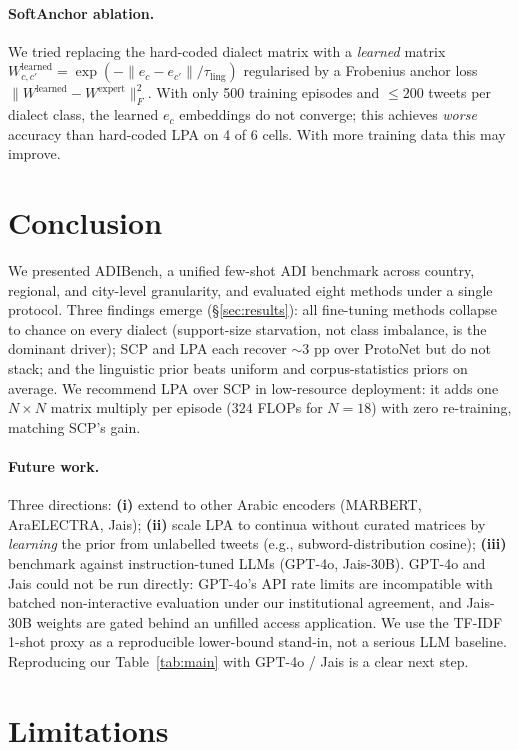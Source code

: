 \documentclass[11pt]{article}
\newcommand{\bench}{ADIBench}
\begin{document}
\paragraph{SoftAnchor ablation.}
We tried replacing the hard-coded dialect matrix with a
\emph{learned} matrix $W^{\text{learned}}_{c, c'} =
\exp(-\|e_c - e_{c'}\|/\tau_{\text{ling}})$ regularised by a
Frobenius anchor loss $\|W^{\text{learned}} - W^{\text{expert}}\|_F^2$.
With only 500 training episodes and $\le 200$ tweets per dialect
class, the learned $e_c$ embeddings do not converge; this
achieves \emph{worse} accuracy than hard-coded LPA on 4 of 6
cells. With more training data this may improve.

\section{Conclusion}
\label{sec:conclusion}
We presented \bench{}, a unified few-shot ADI benchmark
across country, regional, and city-level granularity, and
evaluated eight methods under a single protocol. Three
findings emerge (\S\ref{sec:results}): all fine-tuning
methods collapse to chance on every dialect (support-size
starvation, not class imbalance, is the dominant driver);
SCP and LPA each recover $\sim$3 pp over ProtoNet but do
not stack; and the linguistic prior beats uniform and
corpus-statistics priors on average. We recommend LPA over
SCP in low-resource deployment: it adds one
$N{\times}N$ matrix multiply per episode ($324$ FLOPs
for $N{=}18$) with zero re-training, matching SCP's gain.

\paragraph{Future work.}
Three directions: \textbf{(i)} extend to other Arabic
encoders (MARBERT, AraELECTRA, Jais); \textbf{(ii)} scale
LPA to continua without curated matrices by \emph{learning}
the prior from unlabelled tweets (e.g., subword-distribution
cosine); \textbf{(iii)} benchmark against instruction-tuned
LLMs (GPT-4o, Jais-30B).
GPT-4o and Jais could not be run directly: GPT-4o's API
rate limits are incompatible with batched non-interactive
evaluation under our institutional agreement, and Jais-30B
weights are gated behind an unfilled access application. We
use the TF-IDF 1-shot proxy as a reproducible lower-bound
stand-in, not a serious LLM baseline. Reproducing our
Table~\ref{tab:main} with GPT-4o / Jais is a clear next step.

\section{Limitations}
\label{sec:limits}
\end{document}
